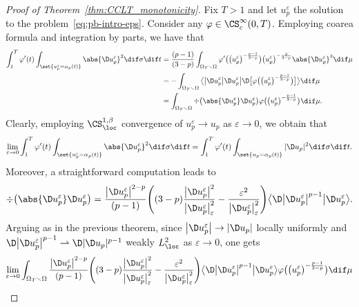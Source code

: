 \documentclass[10pt,a4paper]{amsart}
\numberwithin{equation}{section}
\begin{document}
\begin{proof}[Proof of Theorem~\ref{thm:CCLT_monotonicity}] Fix $T>1$ and let $u^\varepsilon_p$ the solution to the problem~\eqref{eq:pb-intro-eps}. Consider any $\varphi \in \CS^\infty_c(0,T)$. Employing coarea formula and integration by parts, we have that
\begin{align}
 \int_1^{T} \varphi'(t) \int_{\set{u^\varepsilon_p=\alpha_p(t)}} \abs{ \D u^\varepsilon_p}^2 \dif \sigma \dif t &{}= \frac{(p-1)}{(3-p)} \int_{\Omega_T \smallsetminus \Omega} \varphi' \big(\big(u_p^\varepsilon\big)^{-\frac{p-1}{3-p}} \big)\big(u_p^\varepsilon\big)^{-\frac{2}{3-p}} \abs{ \D u^\varepsilon_p}^3 \dif \mu \nonumber\\
 &{}=- \int_{\Omega_T \smallsetminus \Omega} \big\langle\big| \D u^\varepsilon_p\big|\D u^\varepsilon_p\big| \D \big[\varphi \big(\big(u_p^\varepsilon\big)^{-\frac{p-1}{3-p}}\big)\big]\big\rangle \dif \mu \nonumber\\
 &{}= \int_{\Omega_T \smallsetminus \Omega} \div \big( \abs{ \D u^\varepsilon_p} \D u^\varepsilon_p\big) \varphi \big(\big(u_p^\varepsilon\big)^{-\frac{p-1}{3-p}}\big) \dif \mu. \label{eq:main_chan}
\end{align}
Clearly, employing $\CS^{1, \beta}_{\loc}$ convergence of $u^\varepsilon_p \to u_p$ as $\varepsilon \to 0$, we obtain that
\[
 \lim_{\varepsilon\to 0}\int_1^{T} \varphi'(t) \int_{\set{u^\varepsilon_p=\alpha_p(t)}} \abs{ \D u^\varepsilon_p}^2 \dif \sigma \dif t = \int_1^{T} \varphi'(t) \int_{\set{u_p=\alpha_p(t)}} | \D u_p |^2 \dif \sigma \dif t.
\]
Moreover, a straightforward computation leads to
\[
 \div \big( \abs{ \D u^\varepsilon_p} \D u^\varepsilon_p\big) =\frac{\big| \D u^\varepsilon_p\big|^{2-p}}{(p-1)} \Bigg( (3-p) \frac{ \big| \D u^\varepsilon_p\big|^2}{\big| \D u^\varepsilon_p \big|^2_\varepsilon}- \frac{ \varepsilon^2}{\big| \D u^\varepsilon_p\big|_{\varepsilon}^2} \Bigg) \big\langle\D \big| \D u^\varepsilon_p \big|^{p-1} \big| \D u^\varepsilon_p\big\rangle.
\]
Arguing as in the previous theorem, since $\big|\D u^\varepsilon_p\big| \to |\D u_p |$ locally uniformly and $\D\big|\D u^\varepsilon_p\big|^{p-1} \rightharpoonup\D |\D u_p |^{p-1}$ weakly $L^2_{\loc}$ as $\varepsilon\to 0$, one gets
\begin{gather*}
 \lim_{\varepsilon \to 0} \int_{\Omega_T \smallsetminus \Omega} \frac{\big| \D u^\varepsilon_p\big|^{2-p}}{(p-1)} \Bigg( (3-p) \frac{ \big| \D u^\varepsilon_p\big|^2}{\big| \D u^\varepsilon_p \big|^2_\varepsilon}- \frac{ \varepsilon^2}{\big| \D u^\varepsilon_p\big|_{\varepsilon}^2} \Bigg) \big\langle\D \big| \D u^\varepsilon_p \big|^{p-1} \big| \D u^\varepsilon_p\big\rangle \varphi \big(\big(u_p^\varepsilon\big)^{-\frac{p-1}{3-p}}\big) \dif \mu\\

\end{gather*}
\end{proof}
\end{document}
